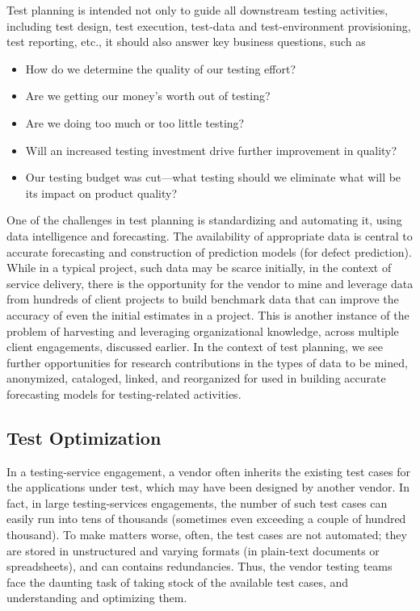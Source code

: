 Test planning is intended not only to guide all downstream testing activities,
including test design, test execution, test-data and test-environment
provisioning, test reporting, etc., it should also answer key business
questions, such as~\cite{Kagan:NextGenTesting}

\begin{itemize}
\denseitems

\item How do we determine the quality of our testing effort?

\item Are we getting our money's worth out of testing?

\item Are we doing too much or too little testing?

\item Will an increased testing investment drive further improvement in quality?

\item Our testing budget was cut---what testing should we eliminate what will be
  its impact on product quality?

\end{itemize}

One of the challenges in test planning is standardizing and automating it, using
data intelligence and forecasting. The availability of appropriate data is
central to accurate forecasting and construction of prediction models (\eg for
defect prediction). While in a typical project, such data may be scarce
initially, in the context of service delivery, there is the opportunity for the
vendor to mine and leverage data from hundreds of client projects to build
benchmark data that can improve the accuracy of even the initial estimates in a
project. This is another instance of the problem of harvesting and leveraging
organizational knowledge, across multiple client engagements, discussed
earlier. In the context of test planning, we see further opportunities for
research contributions in the types of data to be mined, anonymized, cataloged,
linked, and reorganized for used in building accurate forecasting models for
testing-related activities.

\subsection{Test Optimization}
\label{sec:test-design}

In a testing-service engagement, a vendor often inherits the existing test cases
for the applications under test, which may have been designed by another
vendor. In fact, in large testing-services engagements, the number of such test
cases can easily run into tens of thousands (sometimes even exceeding a couple
of hundred thousand).  To make matters worse, often, the test cases are not
automated; they are stored in unstructured and varying formats (\eg in
plain-text documents or spreadsheets), and can contains redundancies. Thus, the
vendor testing teams face the daunting task of taking stock of the available
test cases, and understanding and optimizing them.

